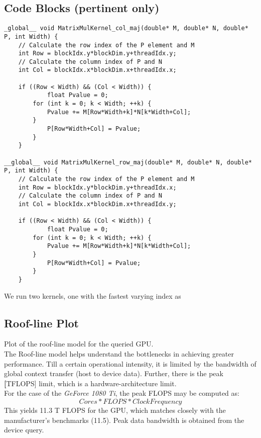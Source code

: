 \subsection {Code Blocks (pertinent only)}
\begin{lstlisting}
_global__ void MatrixMulKernel_col_maj(double* M, double* N, double* P, int Width) { 
    // Calculate the row index of the P element and M
    int Row = blockIdx.y*blockDim.y+threadIdx.y;
    // Calculate the column index of P and N
    int Col = blockIdx.x*blockDim.x+threadIdx.x; 
    
    if ((Row < Width) && (Col < Width)) {
            float Pvalue = 0;
        for (int k = 0; k < Width; ++k) {
            Pvalue += M[Row*Width+k]*N[k*Width+Col];
        }
            P[Row*Width+Col] = Pvalue;
        }
    }

__global__ void MatrixMulKernel_row_maj(double* M, double* N, double* P, int Width) { 
    // Calculate the row index of the P element and M
    int Row = blockIdx.y*blockDim.y+threadIdx.x;
    // Calculate the column index of P and N
    int Col = blockIdx.x*blockDim.x+threadIdx.y; 
    
    if ((Row < Width) && (Col < Width)) {
            float Pvalue = 0;
        for (int k = 0; k < Width; ++k) {
            Pvalue += M[Row*Width+k]*N[k*Width+Col];
        }
            P[Row*Width+Col] = Pvalue;
        }
    }
\end{lstlisting}

We run two kernels, one with the fastest varying index as
\bigskip
\subsection {Roof-line Plot}
\noindent Plot of the roof-line model for the queried GPU.\\

The Roof-line model helps understand the bottlenecks in achieving greater performance. Till a certain operational intensity, it is limited by the bandwidth of global context transfer (host to device data). Further, there is the peak \textbf[TFLOPS] limit, which is a hardware-architecture limit.\\

For the case of the \textit{GeForce 1080 Ti}, the peak FLOPS may be computed as:
$$ Cores * FLOPS *Clock Frequency$$
This yields 11.3 T FLOPS for the GPU, which matches closely with the manufacturer's benchmarks (11.5). Peak data bandwidth is obtained from the device query.

